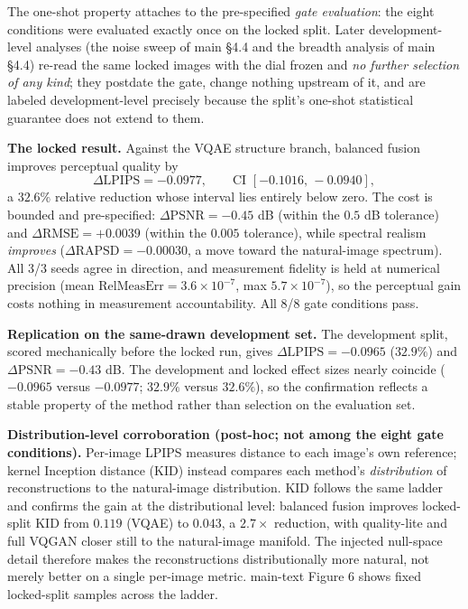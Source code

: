 \documentclass[11pt]{article}
\begin{document}
The one-shot property attaches to the pre-specified \textit{gate evaluation}: the eight conditions were evaluated exactly once on the locked split. Later development-level analyses (the noise sweep of main §4.4 and the breadth analysis of main §4.4) re-read the same locked images with the dial frozen and \textit{no further selection of any kind}; they postdate the gate, change nothing upstream of it, and are labeled development-level precisely because the split's one-shot statistical guarantee does not extend to them.

\textbf{The locked result.} Against the VQAE structure branch, balanced fusion improves perceptual quality by
$$\Delta\mathrm{LPIPS} = -0.0977,\qquad \text{CI }[-0.1016,\,-0.0940],$$
a $32.6\%$ relative reduction whose interval lies entirely below zero. The cost is bounded and pre-specified: $\Delta\mathrm{PSNR} = -0.45$ dB (within the $0.5$ dB tolerance) and $\Delta\mathrm{RMSE} = +0.0039$ (within the $0.005$ tolerance), while spectral realism \textit{improves} ($\Delta\mathrm{RAPSD} = -0.00030$, a move toward the natural-image spectrum). All 3/3 seeds agree in direction, and measurement fidelity is held at numerical precision (mean $\mathrm{RelMeasErr} = 3.6\times10^{-7}$, max $5.7\times10^{-7}$), so the perceptual gain costs nothing in measurement accountability. All 8/8 gate conditions pass.

\textbf{Replication on the same-drawn development set.} The development split, scored mechanically before the locked run, gives $\Delta\mathrm{LPIPS} = -0.0965$ ($32.9\%$) and $\Delta\mathrm{PSNR} = -0.43$ dB. The development and locked effect sizes nearly coincide ($-0.0965$ versus $-0.0977$; $32.9\%$ versus $32.6\%$), so the confirmation reflects a stable property of the method rather than selection on the evaluation set.

\textbf{Distribution-level corroboration (post-hoc; not among the eight gate conditions).} Per-image LPIPS measures distance to each image's own reference; kernel Inception distance (KID) instead compares each method's \textit{distribution} of reconstructions to the natural-image distribution. KID follows the same ladder and confirms the gain at the distributional level: balanced fusion improves locked-split KID from $0.119$ (VQAE) to $0.043$, a $2.7\times$ reduction, with quality-lite and full VQGAN closer still to the natural-image manifold. The injected null-space detail therefore makes the reconstructions distributionally more natural, not merely better on a single per-image metric. main-text Figure 6 shows fixed locked-split samples across the ladder.
\end{document}
